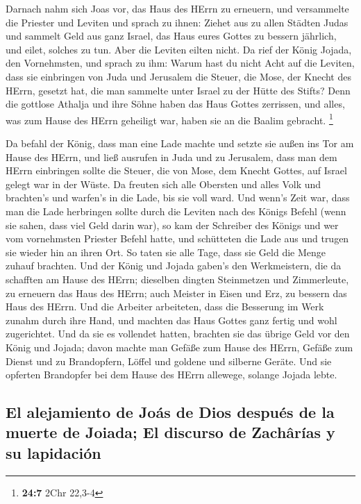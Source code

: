  Darnach nahm sich Joas vor, das Haus des HErrn zu
erneuern,  und versammelte die Priester und Leviten und
sprach zu ihnen: Ziehet aus zu allen Städten Judas und sammelt Geld aus
ganz Israel, das Haus eures Gottes zu bessern jährlich, und eilet,
solches zu tun. Aber die Leviten eilten nicht.  Da rief
der König Jojada, den Vornehmsten, und sprach zu ihm: Warum hast du
nicht Acht auf die Leviten, dass sie einbringen von Juda und Jerusalem
die Steuer, die Mose, der Knecht des HErrn, gesetzt hat, die man
sammelte unter Israel zu der Hütte des Stifts?  Denn die
gottlose Athalja und ihre Söhne haben das Haus Gottes zerrissen, und
alles, was zum Hause des HErrn geheiligt war, haben sie an die Baalim
gebracht. \footnote{\textbf{24:7} 2Chr 22,3-4}

 Da befahl der König, dass man eine Lade machte und setzte
sie außen ins Tor am Hause des HErrn,  und ließ ausrufen
in Juda und zu Jerusalem, dass man dem HErrn einbringen sollte die
Steuer, die von Mose, dem Knecht Gottes, auf Israel gelegt war in der
Wüste.  Da freuten sich alle Obersten und alles Volk und
brachten's und warfen's in die Lade, bis sie voll ward. 
Und wenn's Zeit war, dass man die Lade herbringen sollte durch die
Leviten nach des Königs Befehl (wenn sie sahen, dass viel Geld darin
war), so kam der Schreiber des Königs und wer vom vornehmsten Priester
Befehl hatte, und schütteten die Lade aus und trugen sie wieder hin an
ihren Ort. So taten sie alle Tage, dass sie Geld die Menge zuhauf
brachten.  Und der König und Jojada gaben's den
Werkmeistern, die da schafften am Hause des HErrn; dieselben dingten
Steinmetzen und Zimmerleute, zu erneuern das Haus des HErrn; auch
Meister in Eisen und Erz, zu bessern das Haus des HErrn. 
Und die Arbeiter arbeiteten, dass die Besserung im Werk zunahm durch
ihre Hand, und machten das Haus Gottes ganz fertig und wohl zugerichtet.
 Und da sie es vollendet hatten, brachten sie das übrige
Geld vor den König und Jojada; davon machte man Gefäße zum Hause des
HErrn, Gefäße zum Dienst und zu Brandopfern, Löffel und goldene und
silberne Geräte. Und sie opferten Brandopfer bei dem Hause des HErrn
allewege, solange Jojada lebte.

\hypertarget{el-alejamiento-de-jouxe1s-de-dios-despuuxe9s-de-la-muerte-de-joiada-el-discurso-de-zachuxe2ruxedas-y-su-lapidaciuxf3n}{%
\subsection{El alejamiento de Joás de Dios después de la muerte de
Joiada; El discurso de Zachârías y su
lapidación}\label{el-alejamiento-de-jouxe1s-de-dios-despuuxe9s-de-la-muerte-de-joiada-el-discurso-de-zachuxe2ruxedas-y-su-lapidaciuxf3n}}

